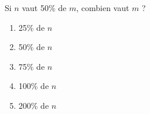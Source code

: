 Si $n$ vaut 50\% de $m$, combien vaut $m$ ?
\begin{multicols}{5}
  \begin{enumerate}[A/]
  \item 25\% de $n$
  \item 50\% de $n$
  \item 75\% de $n$
  \item 100\% de $n$
  \item 200\% de $n$
  \end{enumerate}
\end{multicols}